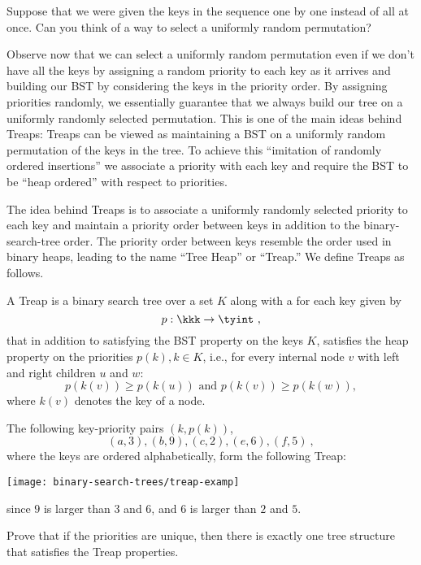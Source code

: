 \begin{notesonly}
\begin{question}
Suppose that we were given the keys in the sequence one by one instead
of all at once.  Can you think of a way to select a uniformly random
permutation?
\end{question}

Observe now that we can select a uniformly random permutation even if
we don't have all the keys by assigning a random priority to each key
as it arrives and building our BST by considering the keys in the
priority order.  By assigning priorities randomly, we essentially
guarantee that we always build our tree on a uniformly randomly
selected permutation.
%
This is one of the main ideas behind Treaps: Treaps can be viewed as
maintaining a BST on a uniformly random permutation of the keys in the
tree. To achieve this ``imitation of randomly ordered insertions''
we associate a priority with each key and require the BST to be ``heap
ordered'' with respect to priorities.
\end{notesonly}

The idea behind Treaps is to associate a uniformly randomly selected
priority to each key and maintain a priority order between keys in
addition to the binary-search-tree order.  The priority order between
keys resemble the order used in binary heaps, leading to the name
``Tree Heap'' or ``Treap.'' We define Treaps as follows.
%
\begin{definition}[Treap]
  A Treap is a binary search tree over a set $K$ along with a
   for each key given by \[p : \kkk \rightarrow
  \tyint~,\] that in addition to satisfying the BST property on the
  keys $K$, satisfies the heap property on the priorities $p(k), k \in
  K$, i.e., for every internal node $v$ with left and right children
  $u$ and $w$:
\[
p(k(v)) \geq p(k(u)) \mbox{ and } p(k(v)) \geq p(k(w)),
\]
where $k(v)$ denotes the key of a node.
\end{definition}

\begin{example}
The following key-priority pairs $(k,p(k))$,
\[ (a,3), (b,9), (c, 2), (e,6), (f, 5)~,\] where the keys are ordered
alphabetically, form the following Treap:
\begin{center}
  \texttt{[image: binary-search-trees/treap-examp]}
\end{center}
since $9$ is larger than $3$ and $6$, and $6$ is larger than $2$ and
$5$.
\end{example}
\begin{exercise}
Prove that if the priorities are unique, then there is exactly one tree
structure that satisfies the Treap properties.
\end{exercise}

